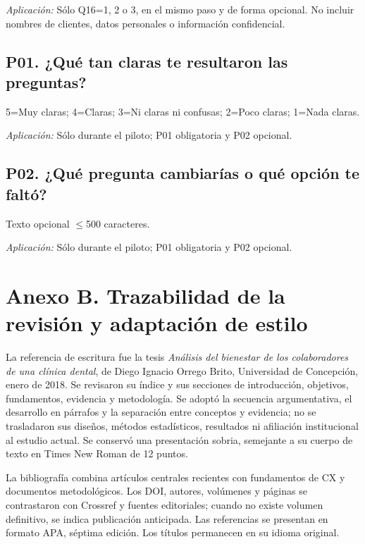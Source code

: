 \documentclass[12pt,letterpaper]{article}
\begin{document}
\emph{Aplicación:} Sólo Q16=1, 2 o 3, en el mismo paso y de forma opcional. No incluir nombres de clientes, datos personales o información confidencial.

\subsection*{P01. ¿Qué tan claras te resultaron las preguntas?}
5=Muy claras; 4=Claras; 3=Ni claras ni confusas; 2=Poco claras; 1=Nada claras.

\emph{Aplicación:} Sólo durante el piloto; P01 obligatoria y P02 opcional.

\subsection*{P02. ¿Qué pregunta cambiarías o qué opción te faltó?}
Texto opcional $\leq$500 caracteres.

\emph{Aplicación:} Sólo durante el piloto; P01 obligatoria y P02 opcional.

\clearpage
\section*{Anexo B. Trazabilidad de la revisión y adaptación de estilo}
La referencia de escritura \citep{tesis} fue la tesis \emph{Análisis del bienestar de los colaboradores de una clínica dental}, de Diego Ignacio Orrego Brito, Universidad de Concepción, enero de 2018. Se revisaron su índice y sus secciones de introducción, objetivos, fundamentos, evidencia y metodología. Se adoptó la secuencia argumentativa, el desarrollo en párrafos y la separación entre conceptos y evidencia; no se trasladaron sus diseños, métodos estadísticos, resultados ni afiliación institucional al estudio actual. Se conservó una presentación sobria, semejante a su cuerpo de texto en Times New Roman de 12 puntos.

La bibliografía combina artículos centrales recientes con fundamentos de CX y documentos metodológicos. Los DOI, autores, volúmenes y páginas se contrastaron con Crossref y fuentes editoriales; cuando no existe volumen definitivo, se indica publicación anticipada. Las referencias se presentan en formato APA, séptima edición. Los títulos permanecen en su idioma original.
\end{document}
